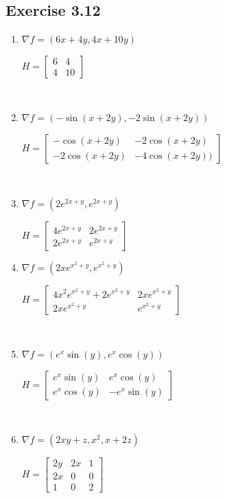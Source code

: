 \documentclass[11pt,fleqn]{book} %
\begin{document}
\subsection*{Exercise 3.12}

\begin{minipage}[t]{0.5\linewidth}    
    \begin{enumerate} 
        \item $\nabla f = (6x + 4y, 4x + 10y)$

        $H = \begin{bmatrix} 6 & 4 \\ 4 & 10 \end{bmatrix}$

        {~~~}

        \item $\nabla f = (-\sin(x + 2y), -2\sin(x + 2y))$

        $H = \begin{bmatrix} -\cos(x + 2y) & -2\cos(x + 2y) \\ -2\cos(x + 2y) & -4\cos(x + 2y)) \end{bmatrix}$

        {~~~}

        \item $\nabla f = (2e^{2x+y}, e^{2x+y})$

        $H = \begin{bmatrix} 4e^{2x+y} & 2e^{2x+y} \\ 2e^{2x+y} & e^{2x+y} \end{bmatrix}$
    \end{enumerate}
\end{minipage}
\begin{minipage}[t]{0.45\linewidth}    
    \begin{enumerate} \setcounter{enumi}{3} 
        \item $\nabla f = (2xe^{x^2+y}, e^{x^2+y})$

        $H = \begin{bmatrix} 4x^2e^{x^2+y} + 2e^{x^2+y} & 2xe^{x^2+y} \\ 2xe^{x^2+y} & e^{x^2+y} \end{bmatrix}$

        {~~~}

        \item $\nabla f = (e^x\sin(y), e^x\cos(y))$

        $H = \begin{bmatrix} e^x\sin(y) & e^x\cos(y) \\ e^x\cos(y) & -e^x\sin(y) \end{bmatrix}$

        {~~~}

        \item $\nabla f = (2xy + z, x^2, x + 2z)$

        $H = \begin{bmatrix} 2y & 2x & 1 \\ 2x & 0 & 0 \\ 1 & 0 & 2 \end{bmatrix}$
    \end{enumerate}
\end{minipage}
\end{document}
